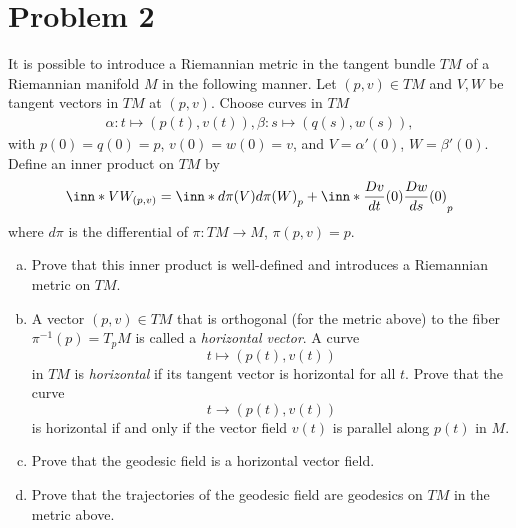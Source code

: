 \documentclass[a4paper]{article}
\begin{document}
  \section*{Problem 2}%
  It is possible to introduce a Riemannian metric in the tangent bundle $TM$ of a Riemannian manifold $M$ in the following manner. Let $(p,v) \in TM$ and $V,W$ be tangent vectors in $TM$ at $(p,v)$. Choose curves in $TM$
  \[
    \begin{aligned}
    \alpha: t \mapsto (p(t), v(t)),
    \beta: s \mapsto (q(s), w(s)),
    \end{aligned}
  \]
  with $p(0) = q(0) = p$, $v(0) = w(0) = v$, and $V = \alpha'(0)$, $W = \beta'(0)$. Define an inner product on $TM$ by 
  \[
    \inn*{V}{W}_{(p,v)} = \inn*{d\pi(V)}{d\pi(W)}_p +  \inn*{\frac{Dv}{dt}(0)}{\frac{Dw}{ds}(0)}_p
  \]
  where $d\pi$ is the differential of $\pi: TM \rightarrow M$, $\pi(p,v) = p$.
  \begin{enumerate}[a)]
    \item Prove that this inner product is well-defined and introduces a Riemannian metric on $TM$.
    \item A vector $(p,v) \in TM$ that is orthogonal (for the metric above) to the fiber $\pi^{-1}(p) = T_pM$ is called a \textit{horizontal vector}. A curve 
      \[
        t \mapsto (p(t), v(t))
      \]
      in $TM$ is \textit{horizontal} if its tangent vector is horizontal for all $t$. Prove that the curve
      \[
        t \rightarrow (p(t), v(t))
      \]
      is horizontal if and only if the vector field $v(t)$ is parallel along $p(t)$ in $M$.
    \item Prove that the geodesic field is a horizontal vector field.
    \item Prove that the trajectories of the geodesic field are geodesics on $TM$ in the metric above.
  \end{enumerate}
\end{document}
